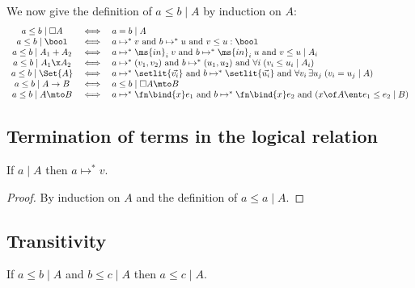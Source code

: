 \documentclass{article}
\newcommand{\step}{\mapsto}
\newcommand{\steps}{\step^*}
\newcommand{\disc}[1]{\square{#1}}
\newcommand{\lr}[2]{#2\mathrel{|}#1}
\newcommand{\lrcx}[3]{#1 \ent \lr{#2}{#3}}
\renewcommand{\land}{~\text{and}~}
\begin{document}
We now give the definition of $\lr{A}{a \le b}$ by induction on $A$:
\[\begin{array}{ccl}
  \lr{\disc{A}}{a \le b} &\iff& \lr{A}{a = b}\\
  \lr{\bool}{a \le b} &\iff&
  a \steps v \land b \steps u \land v \le u : \bool\\
  \lr{A_1 + A_2}{a \le b} &\iff&
  a \steps \ms{in}_i\;v \land b \steps \ms{in}_i\;u \land \lr{A_i}{v \le u}\\
  \lr{A_1 \x A_2}{a \le b} &\iff&
  a \steps (v_1, v_2) \land b \steps (u_1, u_2)
  \land \forall i\; (\lr{A_i}{v_i \le u_i})\\
  \lr{\Set{A}}{a \le b} &\iff&
  a \steps \setlit{\vec{v_i}} \land b \steps \setlit{\vec{u_i}}
  \land \forall v_i\,\exists u_j\; (\lr{A}{v_i = u_j})\\
  \lr{A \to B}{a \le b} &\iff& \lr{\disc{A} \mto B}{a \le b}\\
  \lr{A \mto B}{a \le b} &\iff&
  a \steps \fn\bind{x} e_1 \land b \steps \fn\bind{x} e_2
  \land (\lrcx{x\of A}{B}{e_1 \le e_2})
\end{array}\]


\subsection{Termination of terms in the logical relation}

\begin{theorem}
  If $\lr{A}{a}$ then $a \steps v$.
\end{theorem}

\begin{proof}
  By induction on $A$ and the definition of $\lr{A}{a \le a}$.
\end{proof}


\subsection{Transitivity}
\begin{theorem}[Transitivity]\label{thm:trans}
  If $\lr{A}{a \le b}$ and $\lr{A}{b \le c}$ then $\lr{A}{a \le c}$.
\end{theorem}
\end{document}
